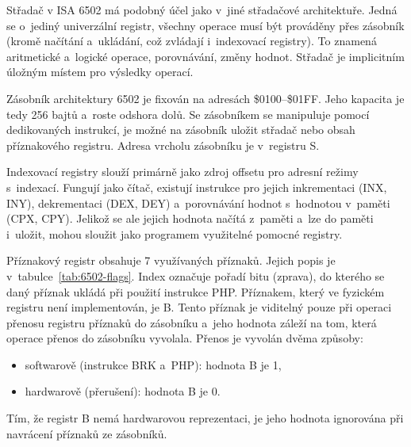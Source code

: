 Střadač v ISA 6502 má podobný účel jako v~jiné střadačové architektuře. Jedná se o~jediný univerzální registr, všechny operace musí být prováděny přes zásobník (kromě načítání a~ukládání, což zvládají i~indexovací registry). To znamená aritmetické a~logické operace, porovnávání, změny hodnot. Střadač je implicitním úložným místem pro výsledky operací.

Zásobník architektury 6502 je fixován na adresách \$0100--\$01FF. Jeho kapacita je tedy 256 bajtů a~roste odshora dolů. Se zásobníkem se manipuluje pomocí dedikovaných instrukcí, je možné na zásobník uložit střadač nebo obsah příznakového registru. Adresa vrcholu zásobníku je v~registru S. 

Indexovací registry slouží primárně jako zdroj offsetu pro adresní režimy s~indexací. Fungují jako čítač, existují instrukce pro jejich inkrementaci (INX, INY), dekrementaci (DEX, DEY) a~porovnávání hodnot s~hodnotou v~paměti (CPX, CPY). Jelikož se ale jejich hodnota načítá z~paměti a~lze do paměti i~uložit, mohou sloužit jako programem využitelné pomocné registry.

Příznakový registr obsahuje 7 využívaných příznaků. Jejich popis je v~tabulce~\ref{tab:6502-flags}. Index označuje pořadí bitu (zprava), do kterého se daný příznak ukládá při použití instrukce PHP. Příznakem, který ve fyzickém registru není implementován, je B. Tento příznak je viditelný pouze při operaci přenosu registru příznaků do zásobníku a~jeho hodnota záleží na tom, která operace přenos do zásobníku vyvolala. Přenos je vyvolán dvěma způsoby:

\begin{itemize}
	\item softwarově (instrukce BRK a~PHP): hodnota B je 1,
	\item hardwarově (přerušení): hodnota B je 0.
\end{itemize}

Tím, že registr B nemá hardwarovou reprezentaci, je jeho hodnota ignorována při navrácení příznaků ze zásobníků.

